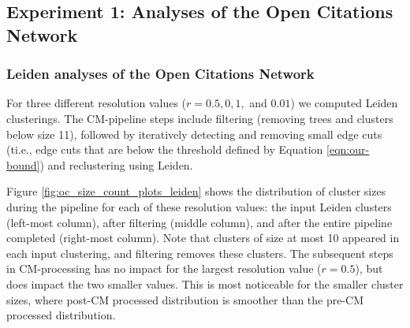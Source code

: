 \documentclass[11pt]{article}   	%
\begin{document}
\subsection{Experiment 1: Analyses of the Open Citations Network}

\subsubsection{Leiden analyses of the Open Citations Network}
For three different resolution values ($r=0.5, 0,1,$ and $0.01$) we computed Leiden clusterings. 
The CM-pipeline steps include filtering (removing trees and clusters below size 11), followed by iteratively detecting and removing small edge cuts (ti.e., edge cuts that are below the threshold
defined by Equation \ref{eqn:our-bound}) and reclustering using Leiden. 


Figure \ref{fig:oc_size_count_plots_leiden} shows the distribution of cluster sizes during the pipeline for each of these resolution values:  the input Leiden clusters (left-most column), after filtering (middle column), and after the entire pipeline completed  (right-most column). 
Note that clusters of size at most 10 appeared in each input clustering, and filtering removes these clusters.
The subsequent steps in CM-processing  has no impact for the largest resolution value ($r=0.5$), but does impact the two smaller values. This is most noticeable for the smaller cluster sizes, where post-CM processed distribution is smoother than the pre-CM processed distribution.
\end{document}
